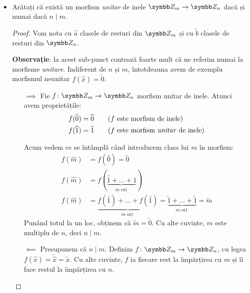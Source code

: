 \begin{exercise}[3.11]
~
\begin{itemize}
    \item Arătați că există un morfism \emph{unitar} de inele \(\integersmod{m} \to \integersmod{n}\) dacă și numai dacă \(n \mid m\).
    \begin{proof}
    Vom nota cu \(\widehat{a}\) clasele de resturi din \(\integersmod{m}\) și cu \(\widetilde{b}\) clasele de resturi din \(\integersmod{n}\).

    \textbf{Observație}: la acest sub-punct contează foarte mult că ne referim numai la morfisme \emph{unitare}. Indiferent de \(n\) și \(m\), întotdeauna avem de exemplu morfismul neunitar \(f(\widehat{x}) = \widetilde{0}\).
    
    \begin{itemize}
        \item[\(\implies\)] Fie \(\function{f}{\integersmod{m}}{\integersmod{n}}\) morfism unitar de inele. Atunci avem proprietățile:
        \begin{align*}
            f(\widehat{0}) &= \widetilde{0} \tag{\(f\) este morfism de inele} \\
            f(\widehat{1}) &= \widetilde{1} \tag{\(f\) este morfism \emph{unitar} de inele}
        \end{align*}
        
        Acum vedem ce se întâmplă când introducem clasa lui \(m\) în morfism:
        \begin{align*}
            f(\widehat{m}) &= f(\widehat{0}) = \widetilde{0} \tag{restul lui \(m\) la împărțirea cu \(m\) este 0} \\
            f(\widehat{m}) &= f(\underbrace{\widehat{1} + \dots + \widehat{1}}_{m \text{ ori }}) \\
            f(\widehat{m}) &= \underbrace{f(\widehat{1}) + \dots + f(\widehat{1})}_{m \text{ ori }} = \underbrace{\widetilde{1} + \dots + \widetilde{1}}_{m \text{ ori }} = \widetilde{m}
        \end{align*}
        Punând totul la un loc, obținem că \(\widetilde{m} = \widetilde{0}\). Cu alte cuvinte, \(m\) este multiplu de \(n\), deci \(n \mid m\).
        
        \item[\(\impliedby\)] Presupunem că \(n \mid m\). Definim \(\function{f}{\integersmod{m}}{\integersmod{n}}\), cu legea \(f(\widehat{x}) = \widetilde{\widehat{x}} = \widetilde{x}\). Cu alte cuvinte, \(f\) ia fiecare rest la împărțirea cu \(m\) și îi face restul la împărțirea cu \(n\).
    

\end{itemize}
\end{proof}
\end{itemize}
\end{exercise}
